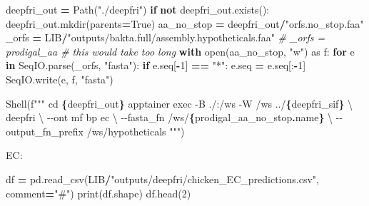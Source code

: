 \documentclass[
]{book}
\newenvironment{Shaded}{\begin{snugshade}}{\end{snugshade}}
\newcommand{\BuiltInTok}[1]{#1}
\newcommand{\CharTok}[1]{\textcolor[rgb]{0.31,0.60,0.02}{#1}}
\newcommand{\CommentTok}[1]{\textcolor[rgb]{0.56,0.35,0.01}{\textit{#1}}}
\newcommand{\ControlFlowTok}[1]{\textcolor[rgb]{0.13,0.29,0.53}{\textbf{#1}}}
\newcommand{\DecValTok}[1]{\textcolor[rgb]{0.00,0.00,0.81}{#1}}
\newcommand{\ImportTok}[1]{#1}
\newcommand{\KeywordTok}[1]{\textcolor[rgb]{0.13,0.29,0.53}{\textbf{#1}}}
\newcommand{\NormalTok}[1]{#1}
\newcommand{\OperatorTok}[1]{\textcolor[rgb]{0.81,0.36,0.00}{\textbf{#1}}}
\newcommand{\SpecialCharTok}[1]{\textcolor[rgb]{0.81,0.36,0.00}{\textbf{#1}}}
\newcommand{\SpecialStringTok}[1]{\textcolor[rgb]{0.31,0.60,0.02}{#1}}
\newcommand{\StringTok}[1]{\textcolor[rgb]{0.31,0.60,0.02}{#1}}
\newcommand{\VariableTok}[1]{\textcolor[rgb]{0.00,0.00,0.00}{#1}}
\begin{document}
\begin{Shaded}
\begin{Highlighting}[numbers=left,,]
\NormalTok{deepfri\_out }\OperatorTok{=}\NormalTok{ Path(}\StringTok{"./deepfri"}\NormalTok{)}
\ControlFlowTok{if} \KeywordTok{not}\NormalTok{ deepfri\_out.exists():}
\NormalTok{    deepfri\_out.mkdir(parents}\OperatorTok{=}\VariableTok{True}\NormalTok{)}
\NormalTok{aa\_no\_stop }\OperatorTok{=}\NormalTok{ deepfri\_out}\OperatorTok{/}\StringTok{"orfs.no\_stop.faa"}
\NormalTok{\_orfs }\OperatorTok{=}\NormalTok{ LIB}\OperatorTok{/}\StringTok{"outputs/bakta.full/assembly.hypotheticals.faa"}
\CommentTok{\# \_orfs = prodigal\_aa \# this would take too long}
\ControlFlowTok{with} \BuiltInTok{open}\NormalTok{(aa\_no\_stop, }\StringTok{"w"}\NormalTok{) }\ImportTok{as}\NormalTok{ f:}
    \ControlFlowTok{for}\NormalTok{ e }\KeywordTok{in}\NormalTok{ SeqIO.parse(\_orfs, }\StringTok{"fasta"}\NormalTok{):}
        \ControlFlowTok{if}\NormalTok{ e.seq[}\OperatorTok{{-}}\DecValTok{1}\NormalTok{] }\OperatorTok{==} \StringTok{"*"}\NormalTok{:}
\NormalTok{            e.seq }\OperatorTok{=}\NormalTok{ e.seq[:}\OperatorTok{{-}}\DecValTok{1}\NormalTok{]}
\NormalTok{        SeqIO.write(e, f, }\StringTok{"fasta"}\NormalTok{)}
\end{Highlighting}
\end{Shaded}

\begin{Shaded}
\begin{Highlighting}[numbers=left,,]
\NormalTok{Shell(}\SpecialStringTok{f"""}
\SpecialStringTok{cd }\SpecialCharTok{\{}\NormalTok{deepfri\_out}\SpecialCharTok{\}}
\SpecialStringTok{apptainer exec {-}B ./:/ws {-}W /ws ../}\SpecialCharTok{\{}\NormalTok{deepfri\_sif}\SpecialCharTok{\}}\SpecialStringTok{ }\CharTok{\textbackslash{}}
\SpecialStringTok{    deepfri }\CharTok{\textbackslash{}}
\SpecialStringTok{        {-}{-}ont mf bp ec }\CharTok{\textbackslash{}}
\SpecialStringTok{        {-}{-}fasta\_fn /ws/}\SpecialCharTok{\{}\NormalTok{prodigal\_aa\_no\_stop}\SpecialCharTok{.}\NormalTok{name}\SpecialCharTok{\}}\SpecialStringTok{ }\CharTok{\textbackslash{}}
\SpecialStringTok{        {-}{-}output\_fn\_prefix /ws/hypotheticals}
\SpecialStringTok{"""}\NormalTok{)}
\end{Highlighting}
\end{Shaded}

EC:

\begin{Shaded}
\begin{Highlighting}[numbers=left,,]
\NormalTok{df }\OperatorTok{=}\NormalTok{ pd.read\_csv(LIB}\OperatorTok{/}\StringTok{"outputs/deepfri/chicken\_EC\_predictions.csv"}\NormalTok{, comment}\OperatorTok{=}\StringTok{"\#"}\NormalTok{)}
\BuiltInTok{print}\NormalTok{(df.shape)}
\NormalTok{df.head(}\DecValTok{2}\NormalTok{)}
\end{Highlighting}
\end{Shaded}
\end{document}

